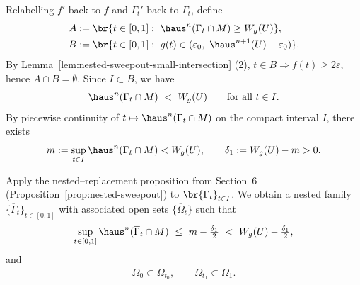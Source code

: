 Relabelling $f'$ back to $f$ and $\Gamma_t'$ back to $\Gamma_t$, define
\begin{equation*}
    \begin{split}
        A&:=\br{t\in[0,1]:\ \haus^n(\Gamma_t\cap M)\ge W_g(U)},\\
        B&:=\br{t\in[0,1]:\ g(t)\in(\varepsilon_0,\ \haus^{n+1}(U)-\varepsilon_0)}.
    \end{split}
\end{equation*}
By Lemma~\ref{lem:nested-sweepout-small-intersection} (2), $t\in B\Rightarrow f(t)\ge 2\varepsilon$, hence $A\cap B=\emptyset$. Since $I\subset B$, we have
\begin{equation*}
\haus^n(\Gamma_t\cap M)\ <\ W_g(U)\qquad\text{for all }t\in I.
\end{equation*}
By piecewise continuity of $t\mapsto \haus^n(\Gamma_t\cap M)$ on the compact interval $I$, there exists
\begin{equation*}
m:=\sup_{t\in I}\haus^n(\Gamma_t\cap M) < W_g(U),\qquad
\delta_1:=W_g(U)-m > 0.
\end{equation*}

Apply the nested–replacement proposition from Section~6 (Proposition~\ref{prop:nested-sweepout}) to $\br{\Gamma_t}_{t\in I}$. 
We obtain a nested family $\{\overline{\Gamma}_t\}_{t\in[0,1]}$ with associated open sets $\{\overline{\Omega}_t\}$ such that
\begin{equation*}
  \sup_{t\in[0,1]}\haus^n(\overline{\Gamma}_t\cap M)\ \le\ m-\tfrac{\delta_1}{2}\ <\ W_g(U)-\tfrac{\delta_1}{2},
\end{equation*}
and
\begin{equation*}
  \overline{\Omega}_0\subset \Omega_{t_0},\qquad \Omega_{t_1}\subset \overline{\Omega}_1.
\end{equation*}

